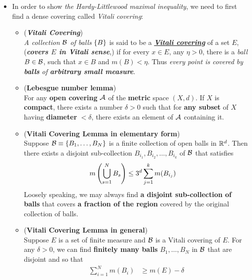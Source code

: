 \documentclass[11pt]{article}
\begin{document}
\begin{itemize}
\item \begin{remark} In order to show \emph{the Hardy-Littlewood maximal inequality}, we need to first find a dense covering called \emph{Vitali covering}: 
\begin{itemize}
\item \begin{definition}(\emph{\textbf{Vitali Covering}}) \citep{royden1988real, stein2009real}\\
\emph{A collection ${\mathcal B}$ of balls} $\left\{B\right\}$ is said to be a \underline{\emph{\textbf{Vitali covering}}} of a set $E$, (\emph{\textbf{covers $E$ in Vitali sense}},) if for every $x\in E$,  any $\eta>0$, there is a \emph{ball} $B\in {\mathcal B}$, such that $x\in B$ and $m(B)<\eta$. Thus \emph{every point is covered by \textbf{balls} of \textbf{arbitrary small measure}}.
\end{definition}


\item \begin{lemma}(\textbf{Lebesgue number lemma})\\
For any \textbf{open covering} ${\mathcal A}$ of the \textbf{metric} space $(X,d)$. If $X$ is \textbf{compact}, there exists a number $\delta>0$ such that for \textbf{any subset} of $X$ having \textbf{diameter} $<\delta$, there exists an element of ${\mathcal A}$ containing it. 
\end{lemma}

\item \begin{lemma}(\textbf{Vitali Covering Lemma in elementary form}) \citep{stein2009real}\\
Suppose ${\mathcal B} \equiv \left\{B_{1},\ldots, B_{N}\right\}$ is a finite collection of open balls in ${\mathbb R}^{d}$. Then there exists a disjoint sub-collection $B_{i_{1}}, B_{i_2}, \ldots, B_{i_k}$ of ${\mathcal B}$ that satisfies
\begin{align*}
m\left(\bigcup_{s=1}^{N}B_{s}\right) &\le 3^{d}\sum_{j=1}^{k}m(B_{i_{j}}) 
\end{align*}
Loosely speaking, we may always find \textbf{a disjoint sub-collection of balls} that covers \textbf{a fraction of the region} covered by the original collection of balls. 
\end{lemma}

\item 
\begin{lemma} (\textbf{Vitali Covering Lemma in general})  \citep{stein2009real, folland2013real}\\
Suppose $E$ is a set of finite measure and ${\mathcal B}$ is a Vitali covering of $E$. For any $\delta>0$, we can find \textbf{finitely many balls} $B_{1},\ldots, B_{N}$ in ${\mathcal B}$ that are disjoint and so that 
\begin{align*}
\sum_{i=1}^{N}m(B_{i}) &\ge m(E) - \delta
\end{align*}
\end{lemma}


\end{itemize}
\end{remark}
\end{itemize}
\end{document}
